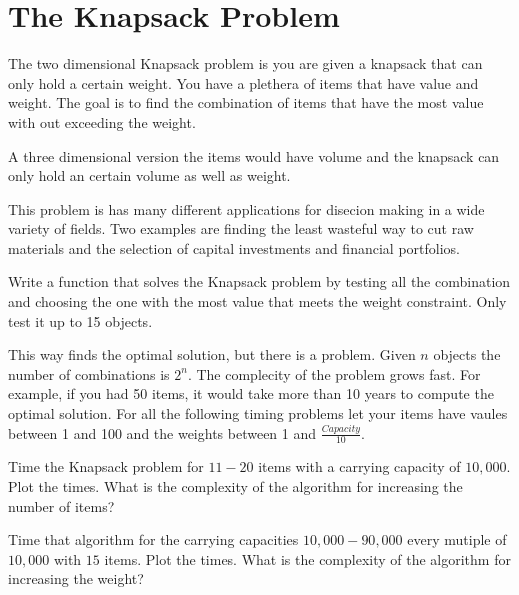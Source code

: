 \label{Ch:Knapsack}


\section*{The Knapsack Problem}


The two dimensional Knapsack problem is you are given a knapsack that can only hold a certain weight. You have a plethera of items that have value and weight. The goal is to find the combination of items that have the most value with out exceeding the weight.

A three dimensional version the items would have volume and the knapsack can only hold an certain volume as well as weight. 

This problem is has many different applications for disecion making in a wide variety of fields. Two examples are finding the least wasteful way to cut raw materials and the selection of capital investments and financial portfolios.

\begin{problem}
Write a function that solves the Knapsack problem by testing all the combination and choosing the one with the most value that meets the weight constraint. Only test it up to 15 objects.
\end{problem}

This way finds the optimal solution, but there is a problem. Given $n$ objects the number of combinations is $2^n$. The complecity of the problem grows fast. For example, if you had 50 items, it would take more than 10 years to compute the optimal solution. For all the following timing problems let your items have vaules between 1 and 100 and the weights between 1 and $\frac{Capacity}{10}$.

\begin{problem}
Time the Knapsack problem for $11-20$ items with a carrying capacity of $10,000$. Plot the times. What is the complexity of the algorithm for increasing the number of items?
\end{problem}

\begin{problem}
Time that algorithm for the carrying capacities $10,000-90,000$ every mutiple of $10,000$ with $15$ items. Plot the times. What is the complexity of the algorithm for increasing the weight?
\end{problem}

